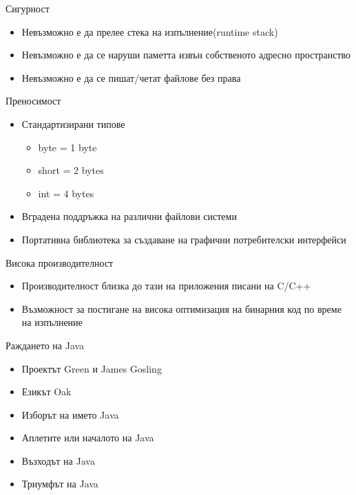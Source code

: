 \documentclass{beamer}
\begin{document}
\begin{frame}{Сигурност}
  \transdissolve  
  \begin{itemize}
   \item Невъзможно е да прелее стека на
    изпълнение(runtime stack) \pause
   \item Невъзможно е да се наруши паметта
    извън собственото адресно
    пространство \pause
   \item Невъзможно е да се пишат/четат
    файлове без права
  \end{itemize}
\end{frame}

\begin{frame}{Преносимост}
  \transdissolve
  \begin{itemize}
  \item Стандартизирани типове
    \begin{itemize}
      \item byte = 1 byte
      \item short = 2 bytes
      \item int = 4 bytes
    \end{itemize}
    \pause
  \item Вградена поддръжка на различни
  файлови системи \pause
  \item Портативна библиотека за създаване на графични потребителски интерфейси
  \end{itemize}
\end{frame}

\begin{frame}{Висока производителност}
  \transdissolve
  \begin{itemize}
  \item Производителност близка до тази на
  приложения писани на C/C++ \pause
  \item Възможност за постигане на висока
  оптимизация на бинарния код по време
  на изпълнение
\end{itemize}
\end{frame}

\begin{frame}{Раждането на Java}
  \transdissolve
  \begin{itemize}
    \item Проектът Green и James Gosling \pause
    \item Езикът Oak \pause
    \item Изборът на името Java \pause
    \item Аплетите или началото на Java \pause
    \item Възходът на Java \pause
    \item Триумфът на Java
  \end{itemize}
\end{frame}
\end{document}
